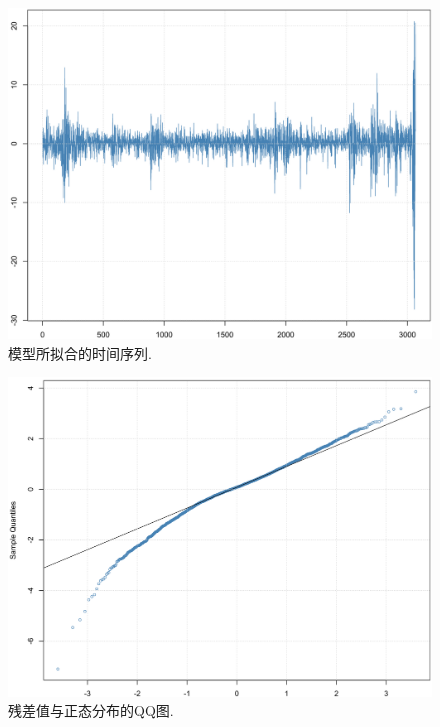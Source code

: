 \documentclass[12pt]{article}
\begin{document}
\begin{center}
    \hspace{30pt}\begin{minipage}{0.4\textwidth}
        \begin{figure}
            \centering
            \hspace{-25pt}\includegraphics[width=.9\textwidth]{output_36_0}
            \caption{模型所拟合的时间序列.\label{fig:13}}
        \end{figure}
    \end{minipage}
    \begin{minipage}{0.4\textwidth}
        \begin{figure}
            \centering
            \hspace{-25pt}\includegraphics[width=.9\textwidth]{output_37_0}
            \caption{残差值与正态分布的QQ图.\label{fig:14}}
        \end{figure}
    \end{minipage}
\end{center}
\end{document}
